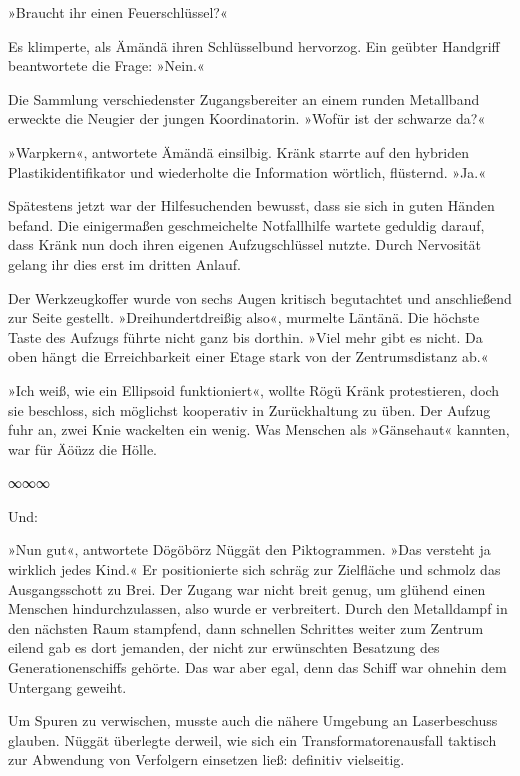 »Braucht ihr einen Feuerschlüssel?«

Es klimperte, als Ämändä ihren Schlüsselbund hervorzog. Ein geübter Handgriff beantwortete die Frage: »Nein.«

Die Sammlung verschiedenster Zugangsbereiter an einem runden Metallband erweckte die Neugier der jungen Koordinatorin. »Wofür ist der schwarze da?«

»Warpkern«, antwortete Ämändä einsilbig. Kränk starrte auf den hybriden Plastikidentifikator und wiederholte die Information wörtlich, flüsternd. »Ja.«

Spätestens jetzt war der Hilfesuchenden bewusst, dass sie sich in guten Händen befand. Die einigermaßen geschmeichelte Notfallhilfe wartete geduldig darauf, dass Kränk nun doch ihren eigenen Aufzugschlüssel nutzte. Durch Nervosität gelang ihr dies erst im dritten Anlauf.

Der Werkzeugkoffer wurde von sechs Augen kritisch begutachtet und anschließend zur Seite gestellt. »Dreihundertdreißig also«, murmelte Läntänä. Die höchste Taste des Aufzugs führte nicht ganz bis dorthin. »Viel mehr gibt es nicht. Da oben hängt die Erreichbarkeit einer Etage stark von der Zentrumsdistanz ab.«

»Ich weiß, wie ein Ellipsoid funktioniert«, wollte Rögü Kränk protestieren, doch sie beschloss, sich möglichst kooperativ in Zurückhaltung zu üben. Der Aufzug fuhr an, zwei Knie wackelten ein wenig. Was Menschen als »Gänsehaut« kannten, war für Äöüzz die Hölle.

\begin{center}
	∞∞∞
\end{center}

 Und: 

»Nun gut«, antwortete Dögöbörz Nüggät den Piktogrammen. »Das versteht ja wirklich jedes Kind.« Er positionierte sich schräg zur Zielfläche und schmolz das Ausgangsschott zu Brei. Der Zugang war nicht breit genug, um glühend einen Menschen hindurchzulassen, also wurde er verbreitert. Durch den Metalldampf in den nächsten Raum stampfend, dann schnellen Schrittes weiter zum Zentrum eilend gab es dort jemanden, der nicht zur erwünschten Besatzung des Generationenschiffs gehörte. Das war aber egal, denn das Schiff war ohnehin dem Untergang geweiht.

Um Spuren zu verwischen, musste auch die nähere Umgebung an Laserbeschuss glauben. Nüggät überlegte derweil, wie sich ein Transformatorenausfall taktisch zur Abwendung von Verfolgern einsetzen ließ: definitiv vielseitig.

